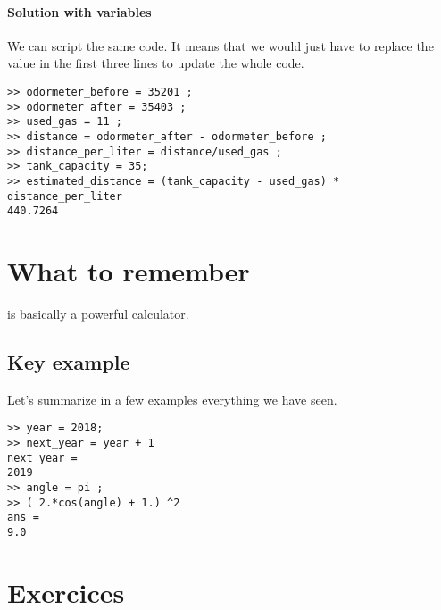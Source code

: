 \paragraph*{Solution with variables}

We can script the same code. It means that we would just have to replace the value in the first three lines to update the whole code. 


\begin{lstlisting}
>> odormeter_before = 35201 ;
>> odormeter_after = 35403 ; 
>> used_gas = 11 ;
>> distance = odormeter_after - odormeter_before ;  
>> distance_per_liter = distance/used_gas ;
>> tank_capacity = 35;
>> estimated_distance = (tank_capacity - used_gas) * distance_per_liter
440.7264
\end{lstlisting}


\section{What to remember}

\matlab is basically a powerful calculator.

\subsection{Key example}
Let's summarize in a few examples everything we have seen.

\begin{lstlisting}
>> year = 2018;
>> next_year = year + 1
next_year = 
2019
>> angle = pi ;
>> ( 2.*cos(angle) + 1.) ^2 
ans = 
9.0
\end{lstlisting}







\section{Exercices}
